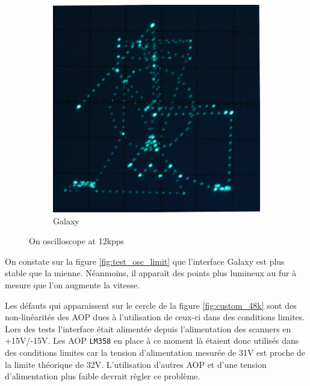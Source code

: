 \begin{figure}[ht]
\begin{bigcenter}
\begin{subfigure}[b]{0.5\textwidth}
                \includegraphics[width=\textwidth]{images/comp/galaxy_10k.jpg}
                \caption{Galaxy}
                \label{fig:galaxy_10k}
        \end{subfigure}       
	\end{bigcenter}
\begin{fr}
\caption{Observation à l'oscilloscope à 12\unit{kpps}}
\end{fr}
\begin{en}
\caption{On oscilloscope at 12\unit{kpps}}
\end{en}
\label{ildatestpattern_point}
\end{figure}

\begin{fr}
On constate sur la figure \ref{fig:test_osc_limit} que l'interface Galaxy est plus stable que la mienne. 
Néanmoins, il apparaît des points plus lumineux au fur à mesure que l'on augmente la vitesse.

Les défauts qui apparaissent sur le cercle de la figure \ref{fig:custom_48k} sont des non-linéarités des AOP dues à l'utilisation  de ceux-ci dans des conditions limites.
Lors des tests l'interface était alimentée depuis l'alimentation des scanners en +15\unit{V}/-15\unit{V}.
Les AOP \texttt{LM358} en place à ce moment là étaient donc utilisés dans des conditions limites car la tension d'alimentation mesurée de 31\unit{V} est proche de la limite théorique de 32\unit{V}.
L'utilisation d'autres AOP et d'une tension d'alimentation plus faible devrait règler ce problème.
\end{fr}

